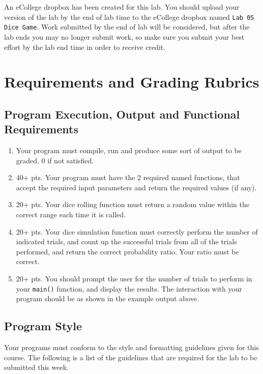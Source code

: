 \documentclass[11pt]{article}
\begin{document}
An eCollege dropbox has been created for this lab.  You should
upload your version of the lab by the end of lab time to the eCollege
dropbox named \verb~Lab 05 Dice Game~.  Work submitted by the end
of lab will be considered, but after the lab ends you may no longer
submit work, so make sure you submit your best effort by the lab end
time in order to receive credit.
\section*{Requirements and Grading Rubrics}
\label{sec-5}

\subsection*{Program Execution, Output and Functional Requirements}
\label{sec-5-1}

\begin{enumerate}
\item Your program must compile, run and produce some sort of output to be
graded. 0 if not satisfied.
\item 40+ pts.  Your program must have the 2 required named functions,
that accept the required input parameters and return the required
values (if any).
\item 20+ pts. Your dice rolling function must return a random value within the
correct range each time it is called.
\item 20+ pts. Your dice simulation function must correctly perform the number of indicated
trials, and count up the successful trials from all of the trials performed,
and return the correct probability ratio.  Your ratio must be correct.
\item 20+ pts. You should prompt the user for the number of trials to
perform in your \verb~main()~ function, and display the results.  The
interaction with your program should be as shown in the example
output above.
\end{enumerate}

\subsection*{Program Style}
\label{sec-5-2}

Your programs must conform to the style and formatting guidelines given for this course.
The following is a list of the guidelines that are required for the lab to be submitted
this week.
\end{document}
